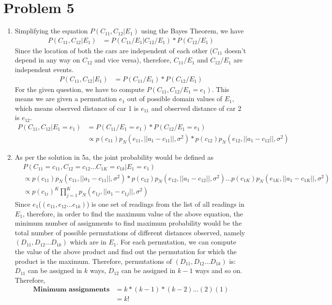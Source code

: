 \documentclass[12pt]{article}
\begin{document}
\section*{Problem 5}

\begin{enumerate}[label=(\alph*)]
  \item Simplifying the equation $P (C_{11}, C_{12} | E_1)$ using the Bayes Theorem, we have
  \begin{align*}
  P (C_{11}, C_{12} | E_1) &= P(C_{11}/E_1| C_{12}/E_1) * P(C_{12}/E_1)
  \end{align*}
  Since the location of both the cars are independent of each other ($C_{11}$ doesn't depend in any way on $C_{12}$ and vice versa), therefore, $C_{11}/E_1$ and $C_{12}/E_1$ are independent events.
  \begin{align*}
  P (C_{11}, C_{12} | E_1) &= P(C_{11}/E_1) * P(C_{12}/E_1)
  \end{align*}
  For the given question, we have to compute $P(C_{11}, C_{12} / E_1 = e_1)$. This means we are given a permutation $e_1$ out of possible domain values of $E_1$, which means observed distance of car 1 is $e_{11}$ and observed distance of car 2 is $e_{12}$.
    \begin{align*}
  P (C_{11}, C_{12} | E_1 = e_1) &= P(C_{11}/E_1 = e_1) * P(C_{12}/E_1 = e_1) \\
  &\propto p(c_{11})p_N (e_{11}, || a_1 - c_{11} ||, \sigma^2) * p(c_{12})p_N (e_{12}, || a_1 - c_{12} ||, \sigma^2)
  \end{align*}
  \item As per the solution in 5a, the joint probability would be defined as
  \begin{align*}
  &P (C_{11} = c_{11}, C_{12} = c_{12} ... C_{1K} = c_{1k} | E_1 = e_1) \\ &\propto p(c_{11})p_N (e_{11}, || a_1 - c_{11} ||, \sigma^2) * p(c_{12})p_N (e_{12}, || a_1 - c_{12} ||, \sigma^2) ... p(c_{1K}) p_N (e_{1K}, || a_1 - c_{1K} ||, \sigma^2) \\
& \propto p(c_{1i})^K \prod_{j=1}^{K} p_N(e_{1j}, || a_1 - c_{1j} ||, \sigma^2)
  \end{align*}
  Since $e_1$($(e_{11}, e_{12} ... e_{1k})$) is one set of readings from the list of all readings in $E_1$, therefore, in order to find the maximum value of the above equation, the minimum number of assignments to find maximum probability would be the total number of possible permutations of different distances observed, namely $(D_{11}, D_{12} ... D_{1k})$ which are in $E_1$. For each permutation, we can compute the value of the above product and find out the permutation for which the product is the maximum. Therefore, permutations of $(D_{11}, D_{12} ... D_{1k})$ is: $D_{11}$ can be assigned in $k$ ways, $D_{12}$ can be assigned in $k-1$ ways and so on. Therefore, 
  \begin{align*}
  \textbf{Minimum assignments} &= k * (k-1) * (k-2) ... (2) (1) \\
  &= k!
\end{align*}
\end{enumerate}
\end{document}
